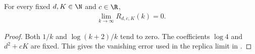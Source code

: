 \begin{theorem}
    \label{thm:bell_overlap_remainder_tendsto}
    \leanok
    For every fixed $d,K\in\N$ and $c\in\R$,
    \begin{align*}
        \lim_{k\to\infty}R_{d,c,K}(k)=0.
    \end{align*}
\end{theorem}
\begin{proof}
    \leanok
    Both $1/k$ and $\log(k+2)/k$ tend to zero. The coefficients
    $\log4$ and $d^2+cK$ are fixed. This gives the vanishing error
    used in the replica limit in
    \cite[\texttt{07-comparators.tex}, lines 659--667]{OpenAI2026AreaLaw}.
\end{proof}
